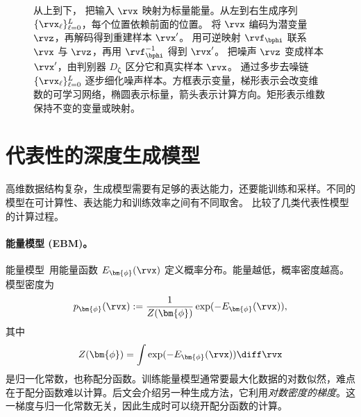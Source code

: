 \begin{figure}[th!]
{}
\vspace{1.0cm}
\caption{ 从上到下， 把输入 $\rvx$ 映射为标量能量。从左到右生成序列 $\{\rvx_\ell\}_{\ell=0}^{L}$，每个位置依赖前面的位置。 将 $\rvx$ 编码为潜变量 $\rvz$，再解码得到重建样本 $\rvx'$。 用可逆映射 $\rvf_\bphi$ 联系 $\rvx$ 与 $\rvz$，再用 $\rvf_\bphi^{-1}$ 得到 $\rvx'$。 把噪声 $\rvz$ 变成样本 $\rvx'$，由判别器 $D_{\bm\zeta}$ 区分它和真实样本 $\rvx$。 通过多步去噪链 $\{\rvx_\ell\}_{\ell=0}^{L}$ 逐步细化噪声样本。方框表示变量，梯形表示会改变维数的可学习网络，椭圆表示标量，箭头表示计算方向。矩形表示维数保持不变的变量或映射。}
\label{fig:ebm-ar-vae-nf-gan-dm-unified}
\end{figure}

\section{代表性的深度生成模型}\label{sec:examples-dgm}


高维数据结构复杂，生成模型需要有足够的表达能力，还要能训练和采样。不同的模型在可计算性、表达能力和训练效率之间有不同取舍。 比较了几类代表性模型的计算过程。


\paragraph{能量模型 (EBM)。}
能量模型~\citep{ackley1985learning,lecun2006tutorial}用能量函数 $ E_{\bm{\phi}}(\rvx) $ 定义概率分布。能量越低，概率密度越高。模型密度为
\begin{equation*}
    p_{\bm{\phi}}(\rvx) := \frac{1}{Z({\bm{\phi}})} \exp(-E_{\bm{\phi}}(\rvx)),
\end{equation*}
其中 
\[Z({\bm{\phi}}) = \int \exp(-E_{\bm{\phi}}(\rvx)) \diff\rvx\] 
是归一化常数，也称配分函数。训练能量模型通常要最大化数据的对数似然，难点在于配分函数难以计算。后文会介绍另一种生成方法，它利用\emph{对数密度的梯度}。这一梯度与归一化常数无关，因此生成时可以绕开配分函数的计算。


